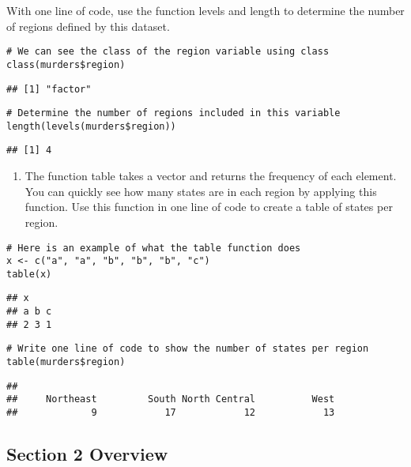\documentclass[
]{article}
\providecommand{\tightlist}{%
  \setlength{\itemsep}{0pt}\setlength{\parskip}{0pt}}
\begin{document}
With one line of code, use the function levels and length to determine
the number of regions defined by this dataset.

\begin{verbatim}
# We can see the class of the region variable using class
class(murders$region)
\end{verbatim}

\begin{verbatim}
## [1] "factor"
\end{verbatim}

\begin{verbatim}
# Determine the number of regions included in this variable 
length(levels(murders$region))
\end{verbatim}

\begin{verbatim}
## [1] 4
\end{verbatim}

\begin{enumerate}
\def\labelenumi{\arabic{enumi}.}
\setcounter{enumi}{5}
\tightlist
\item
  The function table takes a vector and returns the frequency of each
  element. You can quickly see how many states are in each region by
  applying this function. Use this function in one line of code to
  create a table of states per region.
\end{enumerate}

\begin{verbatim}
# Here is an example of what the table function does
x <- c("a", "a", "b", "b", "b", "c")
table(x)
\end{verbatim}

\begin{verbatim}
## x
## a b c 
## 2 3 1
\end{verbatim}

\begin{verbatim}
# Write one line of code to show the number of states per region
table(murders$region)
\end{verbatim}

\begin{verbatim}
## 
##     Northeast         South North Central          West 
##             9            17            12            13
\end{verbatim}

\hypertarget{section-2-overview}{%
\subsection{Section 2 Overview}\label{section-2-overview}}
\end{document}
